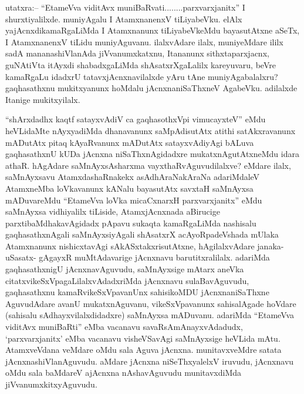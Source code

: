 
\begin{artha}
utatxra:-- ``EtameVva viditAvx muniBaRvati........parxvarxjanitx'' I shurxtiyalilxde. muniyAgalu I AtamxnanenxV tiLiyabeVku. elAlx yajAcnxdikamaRgaLiMda I Atamxnanunx tiLiyabeVkeMdu bayasutAtxne aSeTx, I AtamxnanenxV tiLidu muniyAguvanu. ilalxvAdare ilalx, muniyeMdare ililx sadA mananashiVlanAda jiVvanumxkatxnu, Itananunx sithxtaparxjacnx, guNAtiVta itAyxdi shabadxgaLiMda shAsatxrXgaLalilx kareyuvaru, beVre kamaRgaLu idadxrU tatavxjAcnxnavilalxde yAru tAne muniyAgabalalxru? gaqhasathxnu mukitxyanunx hoMdalu jAcnxnaniSaThxneV AgabeVku. adilalxde Itanige mukitxyilalx.
\end{artha}


\begin{artha}
``shArxdadhx kaqtf satayxvAdiV ca gaqhasothxV\s pi vimucayxteV'' eMdu heVLidaMte nAyxyadiMda dhanavanunx saMpAdisutAtx atithi satAkxravanunx mADutAtx pitaq kAyaRvanunx mADutAtx satayxvAdiyAgi bALuva gaqhasathxnU kUDa jAcnxna niSaThxnAgidadxre mukatxnAgutAtxneMdu idara athaR. hAgAdare saMnAyxsAsharxma vayxthaRvAguvudilalxve? eMdare ilalx, saMnAyxsavu AtamxdashaRnakekx asAdhAraNakAraNa adariMdaleV AtamxneMba loVkavanunx kANalu bayasutAtx savxtaH saMnAyxsa mADuvareMdu ``EtameVva loVka micaCxnarxH parxvarxjanitx'' eMdu saMnAyxsa vidhiyalilx tiLiside, AtamxjAcnxnada aBirucige parxtibaMdhakavAgidadx pApavu sukaqta kamaRgaLiMda nashisalu gaqhasathxnAgali saMnAyxsiyAgali shAsatxrX acAyoRpadeVshada mUlaka Atamxnanunx nishicxtavAgi sAkASxtakxrisutAtxne, hAgilalxvAdare janaka- uSasatx- gAgayxR muMtAdavarige jAcnxnavu barutitxralilalx. adariMda gaqhasathxnigU jAcnxnavAguvudu, saMnAyxsige mAtarx aneVka citatxvikeSxVpagaLilalxvAdadxriMda jAcnxnavu sulaBavAguvudu, gaqhasathxnu kamaRvikeSxVpavanUnx sahisikoMDU jAcnxnaniSaThxne AguvudAdare avanU mukatxnAguvanu, vikeSxVpavanunx sahisalAgade hoVdare (sahisalu sAdhayxvilalxdidadxre) saMnAyxsa mADuvanu. adariMda ``EtameVva viditAvx muniBaRti'' eMba vacanavu savaRsAmAnayxvAdadudx, `parxvarxjanitx' eMba vacanavu visheVSavAgi saMnAyxsige heVLida mAtu. AtamxveVdana veMdare oMdu sala Aguva jAcnxna. munitavxveMdre satata jAcnxnashiVlanAguvudu. aMdare jAcnxna niSeThxyalelxV iruvudu, jAcnxnavu oMdu sala baMdareV ajAcnxna nAshavAguvudu munitavxdiMda jiVvanumxkitxyAguvudu.
\end{artha}


